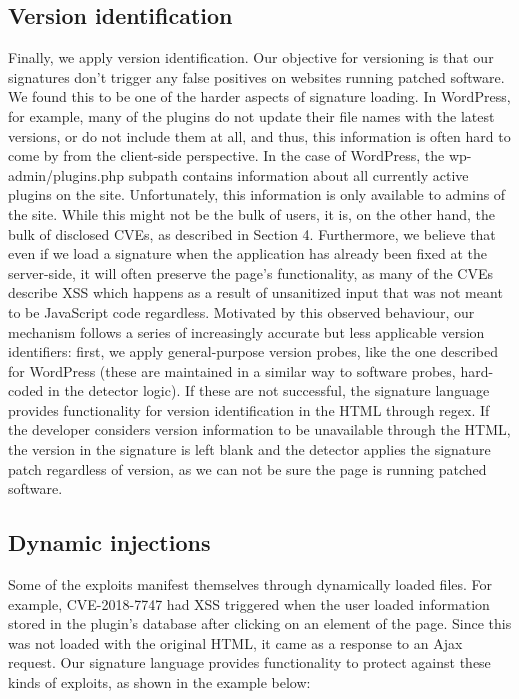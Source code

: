 \subsection{Version identification}
Finally, we apply version identification. Our objective for versioning is that our signatures don't trigger any false positives on websites running patched software. We found this to be one of the harder aspects of signature loading. In WordPress, for example, many of the plugins do not update their file names with the latest versions, or do not include them at all, and thus, this information is often hard to come by from the client-side perspective. In the case of WordPress, the wp-admin/plugins.php subpath contains information about all currently active plugins on the site. Unfortunately, this information is only available to admins of the site. While this might not be the bulk of users, it is, on the other hand, the bulk of disclosed CVEs, as described in Section 4. Furthermore, we believe that even if we load a signature when the application has already been fixed at the server-side, it will often preserve the page's functionality, as many of the CVEs describe XSS which happens as a result of unsanitized input that was not meant to be JavaScript code regardless. Motivated by this observed behaviour, our mechanism follows a series of increasingly accurate but less applicable version identifiers: first, we apply general-purpose version probes, like the one described for WordPress (these are maintained in a similar way to software probes, hard-coded in the detector logic). If these are not successful, the signature language provides functionality for version identification in the HTML through regex. If the developer considers version information to be unavailable through the HTML, the version in the signature is left blank and the detector applies the signature patch regardless of version, as we can not be sure the page is running patched software.

\subsection{Dynamic injections}
Some of the exploits manifest themselves through dynamically loaded files. For example, CVE-2018-7747 had XSS triggered when the user loaded information stored in the plugin's database after clicking on an element of the page. Since this was not loaded with the original HTML, it came as a response to an Ajax request. Our signature language provides functionality to protect against these kinds of exploits, as shown in the example below:

